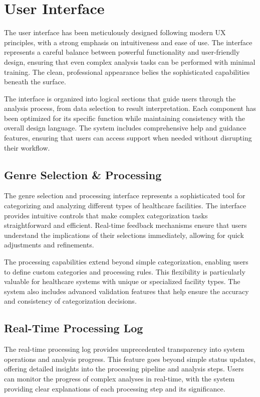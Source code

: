 \documentclass[12pt,a4paper]{report}
\begin{document}
\section{User Interface}
The user interface has been meticulously designed following modern UX principles, with a strong emphasis on intuitiveness and ease of use. The interface represents a careful balance between powerful functionality and user-friendly design, ensuring that even complex analysis tasks can be performed with minimal training. The clean, professional appearance belies the sophisticated capabilities beneath the surface.

The interface is organized into logical sections that guide users through the analysis process, from data selection to result interpretation. Each component has been optimized for its specific function while maintaining consistency with the overall design language. The system includes comprehensive help and guidance features, ensuring that users can access support when needed without disrupting their workflow.

\subsection{Genre Selection \& Processing}
The genre selection and processing interface represents a sophisticated tool for categorizing and analyzing different types of healthcare facilities. The interface provides intuitive controls that make complex categorization tasks straightforward and efficient. Real-time feedback mechanisms ensure that users understand the implications of their selections immediately, allowing for quick adjustments and refinements.

The processing capabilities extend beyond simple categorization, enabling users to define custom categories and processing rules. This flexibility is particularly valuable for healthcare systems with unique or specialized facility types. The system also includes advanced validation features that help ensure the accuracy and consistency of categorization decisions.

\subsection{Real-Time Processing Log}
The real-time processing log provides unprecedented transparency into system operations and analysis progress. This feature goes beyond simple status updates, offering detailed insights into the processing pipeline and analysis steps. Users can monitor the progress of complex analyses in real-time, with the system providing clear explanations of each processing step and its significance.
\end{document}
